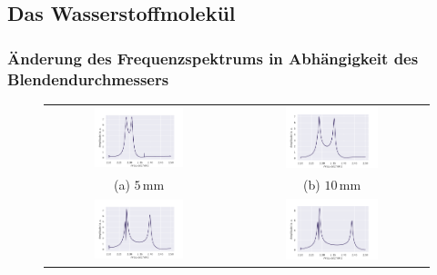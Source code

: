 \subsection{Das Wasserstoffmolekül}
\subsubsection{Änderung des Frequenzspektrums in Abhängigkeit des Blendendurchmessers}
\begin{figure}[H]
  \centering
  \begin{tabular}{cc}
    \includegraphics[width=0.5\textwidth]{Daten/Wasserstoffmolekuelion/H2_5mm.pdf} &   \includegraphics[width=0.5\textwidth]{Daten/Wasserstoffmolekuelion/H2_10mm.pdf} \\
  (a) $5 \, \si{\milli\metre}$  & (b) $10 \, \si{\milli\metre}$ \\[6pt]
  \includegraphics[width=0.5\textwidth]{Daten/Wasserstoffmolekuelion/H2_15mm.pdf} &   \includegraphics[width=0.5\textwidth]{Daten/Wasserstoffmolekuelion/H2_20mm_180.pdf} \\

\end{tabular}
\end{figure}

